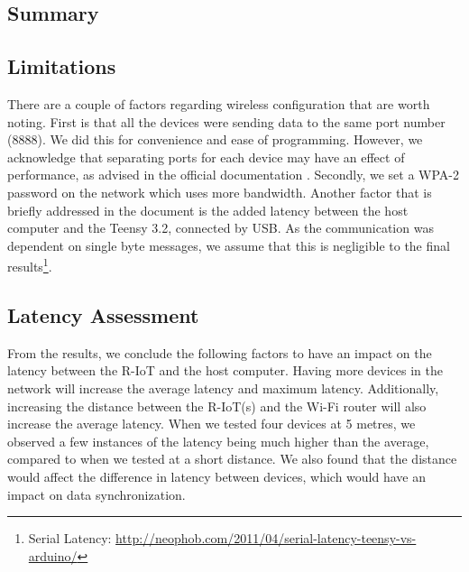 \subsection*{Summary}

\subsection*{Limitations}
\label{subsec:latency_limitations}
There are a couple of factors regarding wireless configuration that are worth noting. First is that all the devices were sending data to the same port number (8888). We did this for convenience and ease of programming. However, we acknowledge that separating ports for each device may have an effect of performance, as advised in the official documentation \cite{noauthor_bitalino_nodate}. Secondly, we set a WPA-2 password on the network which uses more bandwidth. Another factor that is briefly addressed in the document is the added latency between the host computer and the Teensy 3.2, connected by USB. As the communication was dependent on single byte messages, we assume that this is negligible to the final results\footnote{Serial Latency: \url{http://neophob.com/2011/04/serial-latency-teensy-vs-arduino/}}.

\subsection*{Latency Assessment}

From the results, we conclude the following factors to have an impact on the latency between the R-IoT and the host computer. Having more devices in the network will increase the average latency and maximum latency. Additionally, increasing the distance between the R-IoT(s) and the Wi-Fi router will also increase the average latency. When we tested four devices at 5 metres, we observed a few instances of the latency being much higher than the average, compared to when we tested at a short distance. We also found that the distance would affect the difference in latency between devices, which would have an impact on data synchronization.
